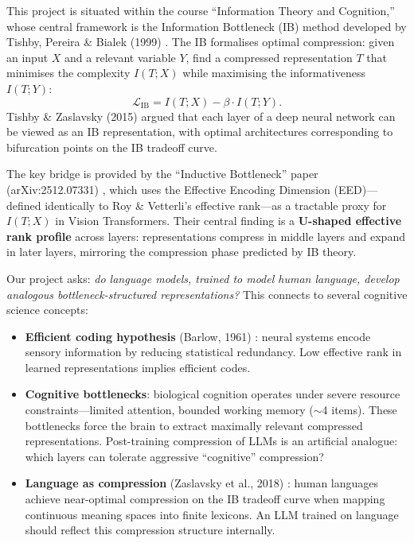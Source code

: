 \documentclass[11pt]{article}
\begin{document}
This project is situated within the course ``Information Theory and Cognition,'' whose central framework is the Information Bottleneck (IB) method developed by Tishby, Pereira \& Bialek (1999) \cite{tishby1999information}.  The IB formalises optimal compression: given an input $X$ and a relevant variable $Y$, find a compressed representation $T$ that minimises the complexity $I(T;X)$ while maximising the informativeness $I(T;Y)$:
\[
    \mathcal{L}_{\mathrm{IB}} = I(T;X) - \beta \cdot I(T;Y).
\]
Tishby \& Zaslavsky (2015) \cite{tishby2015deep} argued that each layer of a deep neural network can be viewed as an IB representation, with optimal architectures corresponding to bifurcation points on the IB tradeoff curve.

The key bridge is provided by the ``Inductive Bottleneck'' paper (arXiv:2512.07331) \cite{inductivebottleneck2025}, which uses the Effective Encoding Dimension (EED)---defined identically to Roy \& Vetterli's effective rank---as a tractable proxy for $I(T;X)$ in Vision Transformers.  Their central finding is a \textbf{U-shaped effective rank profile} across layers: representations compress in middle layers and expand in later layers, mirroring the compression phase predicted by IB theory.

Our project asks: \emph{do language models, trained to model human language, develop analogous bottleneck-structured representations?}  This connects to several cognitive science concepts:
\begin{itemize}
    \item \textbf{Efficient coding hypothesis} (Barlow, 1961) \cite{barlow1961possible}: neural systems encode sensory information by reducing statistical redundancy.  Low effective rank in learned representations implies efficient codes.
    \item \textbf{Cognitive bottlenecks}: biological cognition operates under severe resource constraints---limited attention, bounded working memory ($\sim$4 items).  These bottlenecks force the brain to extract maximally relevant compressed representations.  Post-training compression of LLMs is an artificial analogue: which layers can tolerate aggressive ``cognitive'' compression?
    \item \textbf{Language as compression} (Zaslavsky et al., 2018) \cite{zaslavsky2018efficient}: human languages achieve near-optimal compression on the IB tradeoff curve when mapping continuous meaning spaces into finite lexicons.  An LLM trained on language should reflect this compression structure internally.
\end{itemize}
\end{document}
